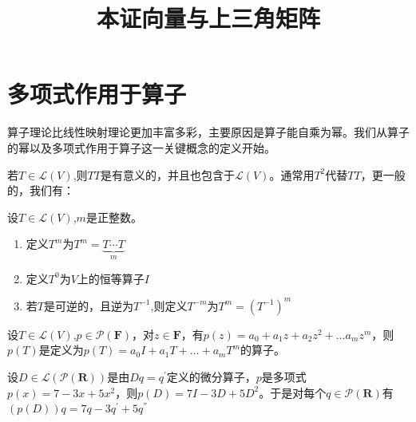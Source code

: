 \documentclass[10pt,a4paper,UTF8]{article}
\date{}
\title{本证向量与上三角矩阵}
\begin{document}
\maketitle
\tableofcontents
{}

\section{多项式作用于算子}
\label{sec:orgbe31485}


算子理论比线性映射理论更加丰富多彩，主要原因是算子能自乘为幂。我们从算子的幂以及多项式作用于算子这一关键概念的定义开始。

若\(T\in \mathcal{L}(V)\),则\(TT\)是有意义的，并且也包含于\(\mathcal{L}(V)\)。通常用\(T^{2}\)代替\(TT\)，更一般的，我们有：
\begin{definition}
设\(T\in \mathcal{L}(V)\),\(m\)是正整数。
\begin{enumerate}
\item 定义\(T^{m}\)为\(T^{m} = \underbrace{T\cdots T}_{m}\)
\item 定义\(T^{0}\)为\(V\)上的恒等算子\(I\)
\item 若\(T\)是可逆的，且逆为\(T^{-1}\),则定义\(T^{-m}\)为\(T^{m} = (T^{-1})^{m}\)
\end{enumerate}
\end{definition}

\begin{definition}
设\(T\in \mathcal{L}(V)\),\(p\in \mathcal{P}(\mathbf{F})\)，对\(z\in \mathbf{F}\)，有\(p(z) = a_{0} + a_{1}z + a_{2}z^{2} + \ldots a_{m}z^{m}\)，则\(p(T)\)是定义为\(p(T) = a_{0}I + a_{1}T + \ldots + a_{m}T^{m}\)的算子。
\end{definition}

\begin{instance}
设\(D\in \mathcal{L}(\mathcal{P}(\mathbf{R}))\)是由\(Dq = q^{'}\)定义的微分算子，\(p\)是多项式\(p(x) = 7 - 3x + 5x^{2}\)，则\(p(D) = 7I - 3D + 5D^{2}\)。于是对每个\(q\in \mathcal{P}(\mathbf{R})\)有\((p(D))q = 7q - 3q^{'} + 5q^{''}\)
\end{instance}
\end{document}
